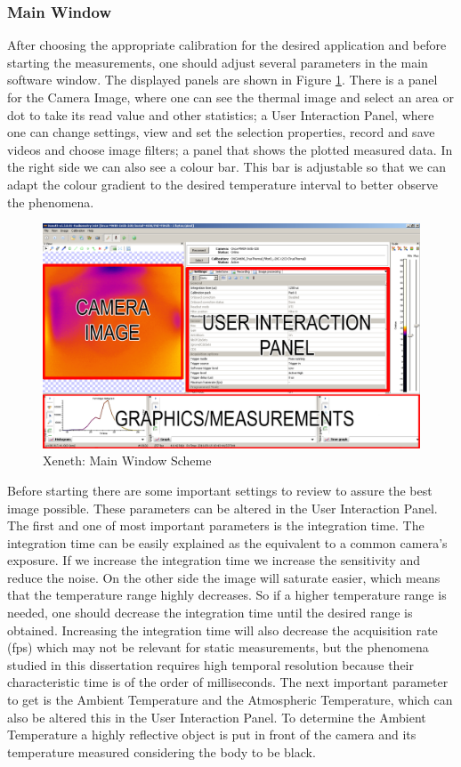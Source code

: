 \subsubsection{Main Window}
\label{software}
\par After choosing the appropriate calibration for the desired application and before starting the measurements, one should adjust several parameters in the main software window. The displayed panels are shown in Figure \ref{fig:xeneth2}. There is a panel for the Camera Image, where one can see the thermal image and select an area or dot to take its read value and other statistics; a User Interaction Panel, where one can change settings, view and set the selection properties, record and save videos and choose image filters; a panel that shows the plotted measured data. In the right side we can also see a colour bar. This bar is adjustable so that we can adapt the colour gradient to the desired temperature interval to better observe the phenomena. \\
\begin{figure}[h]
\centering
\includegraphics[width=0.7\linewidth]{Figures/3.Chapter/xeneth2.png}
\caption{Xeneth: Main Window Scheme}
\label{fig:xeneth2}
\end{figure}
\par Before starting there are some important settings to review to assure the best image possible. These parameters can be altered in the User Interaction Panel. The first and one of most important parameters is the integration time. The integration time can be easily explained as the equivalent to a common camera's exposure. If we increase the integration time we increase the sensitivity and reduce the noise. On the other side the image will saturate easier, which means that the temperature range highly decreases. So if a higher temperature range is needed, one should decrease the integration time until the desired range is obtained. Increasing the integration time will also decrease the acquisition rate (fps) which may not be relevant for static measurements, but the phenomena studied in this dissertation requires high temporal resolution because their characteristic time is of the order of milliseconds. The next important parameter to get is the Ambient Temperature and the Atmospheric Temperature, which can also be altered this in the User Interaction Panel. To determine the Ambient Temperature a highly reflective object is put in front of the camera and its temperature measured considering the body to be black. \\
